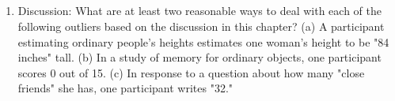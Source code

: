  

\subsection{}
\begin{fullwidth}
\begin{enumerate}
\item Discussion: What are at least two reasonable ways to deal with each of the following outliers based on the discussion in this chapter? (a) A participant estimating ordinary people's heights estimates one woman's height to be "84 inches" tall. (b) In a study of memory for ordinary objects, one participant scores 0 out of 15. (c) In response to a question about how many "close friends" she has, one participant writes "32." 
\end{enumerate}
\end{fullwidth}  


